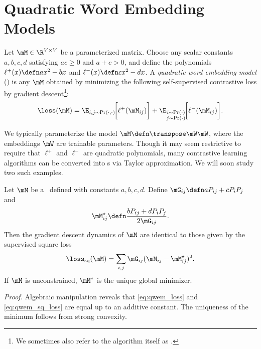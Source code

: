 \section{Quadratic Word Embedding Models}

\begin{definition}
    Let $\M\in\R^{V\times V}$ be a parameterized matrix.
    Choose any scalar constants $a,b,c,d$ satisfying $ac\geq 0$ and $a+c > 0$, and define the polynomials $\ell^{+}(x)\defn ax^2-bx$ and $\ell^{-}(x)\defn cx^2-dx$.
    A \textit{quadratic word embedding model} (\wem) is any $\M$ obtained by minimizing the following self-supervised contrastive loss by gradient descent\footnote{We sometimes also refer to the algorithm itself as \wem.}:
    \begin{equation}
        \loss(\M) = \E_{i,j\sim \Pr(\cdot,\cdot)}\!\bigg[\ell^{+}(\M_{ij})\bigg] 
         + \E_{\substack{i\sim \Pr(\cdot)\\j\sim \Pr(\cdot)}}\!\bigg[\ell^{-}(\M_{ij})\bigg].
         \label{eq:qwem_loss}
    \end{equation}
\end{definition}

We typically parameterize the model $\M\defn \T\mW\mW$, where the embeddings $\mW$ are trainable parameters.
Though it may seem restrictive to require that $\ell^+$ and $\ell^-$ are quadratic polynomials, many contrastive learning algorithms can be converted into \wem s via Taylor approximation. We will soon study two such examples.

\begin{proposition}
    \label{prop:qwem}
    Let $\M$ be a \wem\ defined with constants $a,b,c,d$.
    Define $\mG_{ij} \defn a P_{ij}+c P_i P_j$ 
    and
    \begin{equation}
        \Mstar_{ij} \defn \frac{b P_{ij}+d P_i P_j}{2 \mG_{ij}}.
    \end{equation}
    Then the gradient descent dynamics of $\M$ are identical to those given by the supervised square loss
    \begin{equation}
        \loss_\mathrm{sq}(\M) = \sum_{i,j}\mG_{ij}(\M_{ij}-\Mstar_{ij})^2.
        \label{eq:qwem_sq_loss}
    \end{equation}
    If $\M$ is unconstrained, $\Mstar$ is the unique global minimizer.
\end{proposition}
\textit{Proof.} Algebraic manipulation reveals that \cref{eq:qwem_loss} and \cref{eq:qwem_sq_loss} are equal up to an additive constant. The uniqueness of the minimum follows from strong convexity.

